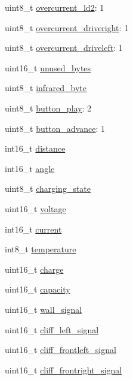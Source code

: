 \begin{DoxyCompactItemize}
uint8\-\_\-t \hyperlink{structoi__t_a63b3a4a6dd3c476079927fa60fde88d3}{overcurrent\-\_\-ld2}\-: 1
\item 
uint8\-\_\-t \hyperlink{structoi__t_a2c848a00f68f3b5bd1fdcd7962d17cb8}{overcurrent\-\_\-driveright}\-: 1
\item 
uint8\-\_\-t \hyperlink{structoi__t_a4eb5c6846b877e3d63653350da731aa1}{overcurrent\-\_\-driveleft}\-: 1
\item 
uint16\-\_\-t \hyperlink{structoi__t_a5fb7f8985cbc9e72e39e9b8438f4bc74}{unused\-\_\-bytes}
\item 
uint8\-\_\-t \hyperlink{structoi__t_ab6ff8f5b484ccd44f538c7c55f6f2ac8}{infrared\-\_\-byte}
\item 
uint8\-\_\-t \hyperlink{structoi__t_acff05868c68b2ef191db3b301010d604}{button\-\_\-play}\-: 2
\item 
uint8\-\_\-t \hyperlink{structoi__t_a5a9f013e54a19158ef0bc8e7ea847e6f}{button\-\_\-advance}\-: 1
\item 
int16\-\_\-t \hyperlink{structoi__t_ad38131f92527ab4d4f780011f74c9d34}{distance}
\item 
int16\-\_\-t \hyperlink{structoi__t_a0674cf41ba25ce1925233d55ea692994}{angle}
\item 
uint8\-\_\-t \hyperlink{structoi__t_a9f5c53905081e3948ecb4705581e966a}{charging\-\_\-state}
\item 
uint16\-\_\-t \hyperlink{structoi__t_a8e84682150888ae78b9a41959ca02c7b}{voltage}
\item 
int16\-\_\-t \hyperlink{structoi__t_a28932f292e470c3f98a0a9f4fc43b2b2}{current}
\item 
int8\-\_\-t \hyperlink{structoi__t_a64d67c7a0daa7db501c94c8c3a47cef5}{temperature}
\item 
uint16\-\_\-t \hyperlink{structoi__t_a156f6a61996c1296a8b97b80d985936c}{charge}
\item 
uint16\-\_\-t \hyperlink{structoi__t_a6be948a502bdacee3d2a2cc1d2f97ece}{capacity}
\item 
uint16\-\_\-t \hyperlink{structoi__t_a7766863f10572288e54fb86e21b16a47}{wall\-\_\-signal}
\item 
uint16\-\_\-t \hyperlink{structoi__t_ad07dbba0decf325109eed7257698aab0}{cliff\-\_\-left\-\_\-signal}
\item 
uint16\-\_\-t \hyperlink{structoi__t_a6160eb2c94466a284d65b1e0eb5b6b7d}{cliff\-\_\-frontleft\-\_\-signal}
\item 
uint16\-\_\-t \hyperlink{structoi__t_aed857f75a15bfd4a053a1072b86c9e2c}{cliff\-\_\-frontright\-\_\-signal}
\item 

\end{DoxyCompactItemize}
